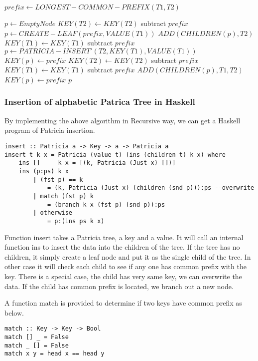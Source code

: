 \documentclass{article}
\begin{document}
\begin{algorithmic}[1]
  \State $prefix \leftarrow LONGEST-COMMON-PREFIX(T1, T2)$

  \State $p \leftarrow EmptyNode$
    \State $KEY(T2) \leftarrow KEY(T2)$ subtract $prefix$
    \State $p \leftarrow CREATE-LEAF(prefix, VALUE(T1))$
    \State $ADD(CHILDREN(p), T2)$
    \State $KEY(T1) \leftarrow KEY(T1)$ subtract $prefix$
    \State $p \leftarrow PATRICIA-INSERT'(T2, KEY(T1), VALUE(T1))$
    \State $KEY(p) \leftarrow prefix$
  \Else
    \State $KEY(T2) \leftarrow KEY(T2)$ subtract $prefix$
    \State $KEY(T1) \leftarrow KEY(T1)$ subtract $prefix$
    \State $ADD(CHILDREN(p), T1, T2)$
    \State $KEY(p) \leftarrow prefix$
  \EndIf
  \State \Return $p$
\EndFunction
\end{algorithmic}

\subsubsection*{Insertion of alphabetic Patrica Tree in Haskell}
By implementing the above algorithm in Recursive way, we can get a
Haskell program of Patricia insertion.

\lstset{language=Haskell}
\begin{lstlisting}
insert :: Patricia a -> Key -> a -> Patricia a
insert t k x = Patricia (value t) (ins (children t) k x) where
    ins []     k x = [(k, Patricia (Just x) [])]
    ins (p:ps) k x
        | (fst p) == k
            = (k, Patricia (Just x) (children (snd p))):ps --overwrite
        | match (fst p) k
            = (branch k x (fst p) (snd p)):ps
        | otherwise
            = p:(ins ps k x)

\end{lstlisting}

Function insert takes a Patricia tree, a key and a value. It will call
an internal function ins to insert the data into the children of the tree.
If the tree has no children, it simply create a leaf node and put it
as the single child of the tree. In other case it will check each child
to see if any one has common prefix with the key. There is a special case,
the child has very same key, we can overwrite the data. If the child has common
prefix is located, we branch out a new node.

A function match is provided to determine if two keys have common prefix as
below.

\begin{lstlisting}
match :: Key -> Key -> Bool
match [] _ = False
match _ [] = False
match x y = head x == head y
\end{lstlisting}
\end{document}
